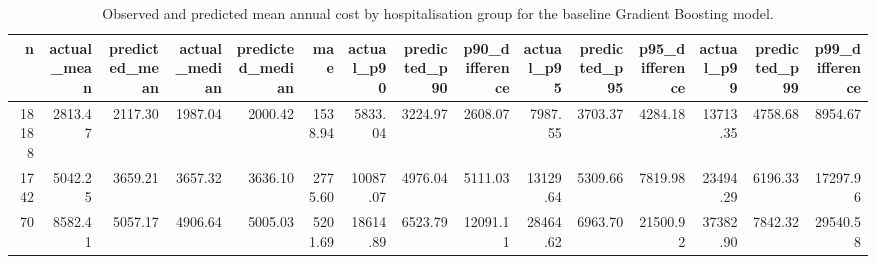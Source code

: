 \begin{table}
\caption{Observed and predicted mean annual cost by hospitalisation group for the baseline Gradient Boosting model.}
\label{tab:05-gb-group-summary-hospitalisation}
\begin{tabular}{rrrrrrrrrrrrrrr}
\toprule
n & actual_mean & predicted_mean & actual_median & predicted_median & mae & actual_p90 & predicted_p90 & p90_difference & actual_p95 & predicted_p95 & p95_difference & actual_p99 & predicted_p99 & p99_difference \\
\midrule
18188 & 2813.47 & 2117.30 & 1987.04 & 2000.42 & 1538.94 & 5833.04 & 3224.97 & 2608.07 & 7987.55 & 3703.37 & 4284.18 & 13713.35 & 4758.68 & 8954.67 \\
1742 & 5042.25 & 3659.21 & 3657.32 & 3636.10 & 2775.60 & 10087.07 & 4976.04 & 5111.03 & 13129.64 & 5309.66 & 7819.98 & 23494.29 & 6196.33 & 17297.96 \\
70 & 8582.41 & 5057.17 & 4906.64 & 5005.03 & 5201.69 & 18614.89 & 6523.79 & 12091.11 & 28464.62 & 6963.70 & 21500.92 & 37382.90 & 7842.32 & 29540.58 \\
\bottomrule
\end{tabular}
\end{table}
